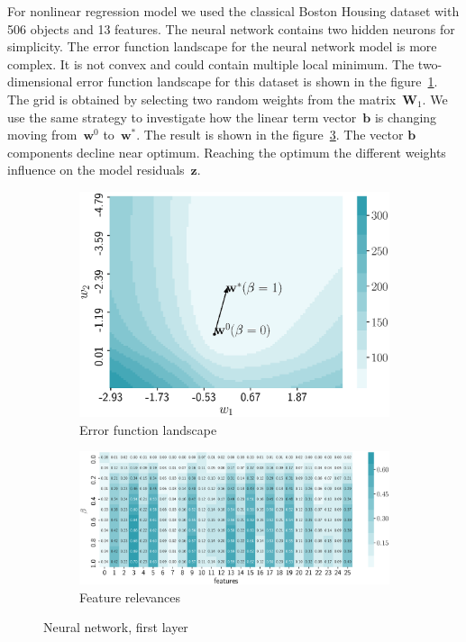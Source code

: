 \documentclass[a4paper,12pt]{article}
\theoremstyle{plain} %
\theoremstyle{definition} %
\theoremstyle{remark} %
\newcommand{\bb}{\mathbf{b}}
\newcommand{\bw}{\mathbf{w}}
\newcommand{\bz}{\mathbf{z}}
\newcommand{\bW}{\mathbf{W}}
\begin{document}
  	For nonlinear regression model we used the classical Boston Housing dataset with 506 objects and 13 features.
  	The neural network contains two hidden neurons for simplicity.
  	The error function landscape for the neural network model is more complex. 
  	It is not convex and could contain multiple local minimum.
  	The two-dimensional error function landscape for this dataset is shown in the figure~\ref{fig:neural_error}. 
  	The grid is obtained by selecting two random weights from the matrix~$\bW_1$.
  	We use the same strategy to investigate how the linear term vector~$\bb$ is changing moving from~$\bw^0$ to~$\bw^*$. 
  	The result is shown in the figure~\ref{fig:neural_b_wrt_beta}.
  	The vector $\bb$ components decline near optimum. Reaching the optimum the different weights influence on the model residuals~$\bz$.
  
  \begin{figure}[!h]
  	\centering
  	\begin{subfigure}{.5\textwidth}
  		\centering
  		\includegraphics[width=\linewidth]{figs/neural_error.eps}
  		\caption{Error function landscape}
  		\label{fig:neural_error}
  	\end{subfigure}%
  	\begin{subfigure}{.5\textwidth}
  		\centering
  		\includegraphics[width=\linewidth]{figs/neural_b_wrt_beta.eps}
  		\caption{Feature relevances}
  		\label{fig:neural_b_wrt_beta}
  	\end{subfigure}
  	\caption{Neural network, first layer}
  \end{figure}
\end{document}
